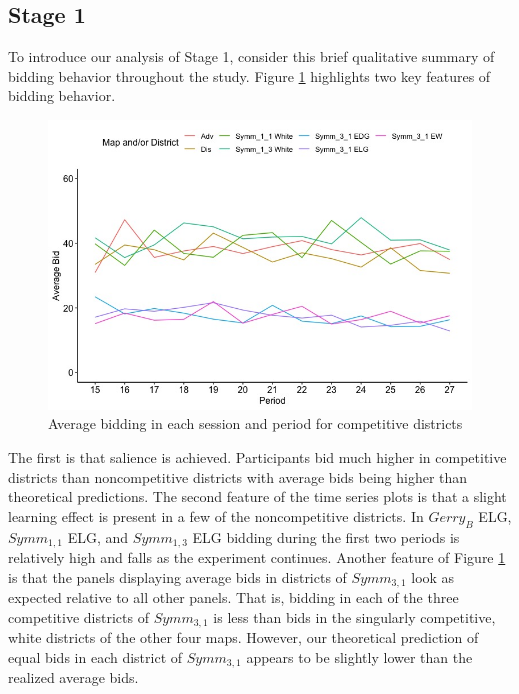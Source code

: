 \documentclass[AER]{AEA}
\begin{document}
\subsection{Stage 1}
\label{subsection:Stage_1}

To introduce our analysis of Stage 1, consider this brief qualitative summary of bidding behavior throughout the study. Figure \ref{fig:full_bidding_time_series} highlights two key features of bidding behavior. 
\begin{figure}[h]
\centering
\includegraphics[scale=0.5]{full_bidding_time_series}
\caption{Average bidding in each session and period for competitive districts}
\label{fig:full_bidding_time_series}
\end{figure}
The first is that salience is achieved. Participants bid much higher in competitive districts than noncompetitive districts with average bids being higher than theoretical predictions. The second feature of the time series plots is that a slight learning effect is present in a few of the noncompetitive districts. In $Gerry_B$ ELG, $Symm_{1,1}$ ELG, and $Symm_{1,3}$ ELG bidding during the first two periods is relatively high and falls as the experiment continues. Another feature of Figure \ref{fig:full_bidding_time_series} is that the panels displaying average bids in districts of $Symm_{3,1}$ look as expected relative to all other panels. That is, bidding in each of the three competitive districts of $Symm_{3,1}$ is less than bids in the singularly competitive, white districts of the other four maps. However, our theoretical prediction of equal bids in each district of $Symm_{3,1}$ appears to be slightly lower than the realized average bids.
\end{document}
